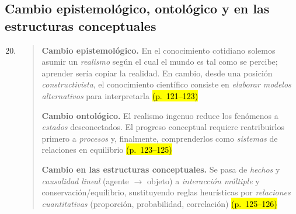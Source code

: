 \documentclass{article}
\begin{document}
\subsection*{Cambio epistemológico, ontológico y en las estructuras conceptuales}

\begin{enumerate}
  \setcounter{enumi}{19}
  \item \begin{quote}
  \textbf{Cambio epistemológico.} En el conocimiento cotidiano solemos asumir un \textit{realismo} según el cual el mundo es tal como se percibe; aprender sería copiar la realidad. En cambio, desde una posición \textit{constructivista}, el conocimiento científico consiste en \textit{elaborar modelos alternativos} para interpretarla \hl{(p.~121–123)}

  \textbf{Cambio ontológico.} El realismo ingenuo reduce los fenómenos a \textit{estados} desconectados. El progreso conceptual requiere reatribuirlos primero a \textit{procesos} y, finalmente, comprenderlos como \textit{sistemas} de relaciones en equilibrio \hl{(p.~123–125)}

  \textbf{Cambio en las estructuras conceptuales.} Se pasa de \textit{hechos} y \textit{causalidad lineal} (agente $\rightarrow$ objeto) a \textit{interacción múltiple} y conservación/equilibrio, sustituyendo reglas heurísticas por \textit{relaciones cuantitativas} (proporción, probabilidad, correlación) \hl{(p.~125–126)}
  \end{quote}
\end{enumerate}


 
\end{document}
